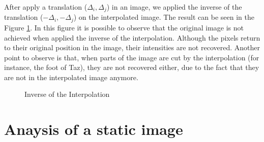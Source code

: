 \documentclass{article}
\begin{document}
	After apply a translation ($\Delta_i,\Delta_j$) in an image, we applied the inverse of the translation ($-\Delta_i,-\Delta_j$) on the interpolated image. The result can be seen in the Figure \ref{fig:inverseinterp}. In this figure it is possible to observe that the original image is not achieved when applied the inverse of the interpolation. Although the pixels return to their original position in the image, their intensities are not recovered. Another point to observe is that, when parts of the image are cut by the interpolation (for instance, the foot of Taz), they are not recovered either, due to the fact that they are not in the interpolated image anymore.

	\begin{figure}[H]
		  \centering
		  \hspace{0.1cm}
		  \hspace{0.1cm}
		  \caption{Inverse of the Interpolation}
		  \label{fig:inverseinterp}
	\end{figure}	


\section{Anaysis of a static image}
\end{document}
